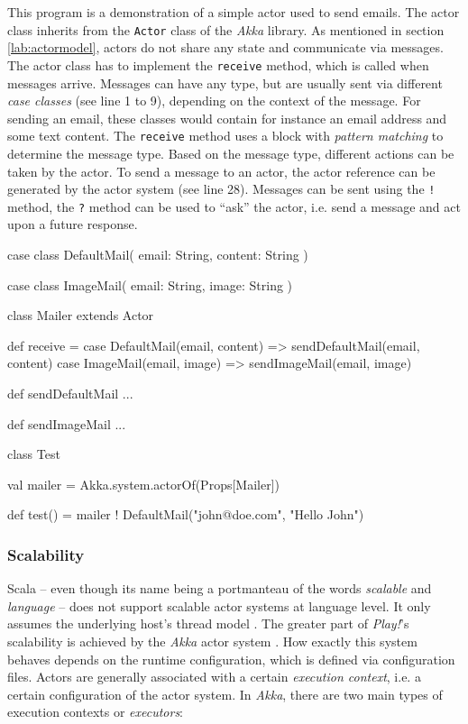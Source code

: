 \begin{program}
  \caption{This program is a demonstration of a simple actor used to send emails. The actor class inherits from the \texttt{Actor} class of the \textit{Akka} library. As mentioned in section \ref{lab:actormodel}, actors do not share any state and communicate via messages. The actor class has to implement the \texttt{receive} method, which is called when messages arrive. Messages can have any type, but are usually sent via different \textit{case classes} (see line 1 to 9), depending on the context of the message. For sending an email, these classes would contain for instance an email address and some text content. The \texttt{receive} method uses a block with \textit{pattern matching} to determine the message type. Based on the message type, different actions can be taken by the actor. To send a message to an actor, the actor reference can be generated by the actor system (see line 28). Messages can be sent using the \texttt{!} method, the \texttt{?} method can be used to ``ask'' the actor, i.e. send a message and act upon a future response.}
  \label{prog:scala-actors}
  \begin{JavaCode}
case class DefaultMail(
    email: String,
    content: String
)

case class ImageMail(
    email: String,
    image: String
)

class Mailer extends Actor {
    
    def receive = {
        case DefaultMail(email, content) =>
            sendDefaultMail(email, content)
        case ImageMail(email, image) =>
            sendImageMail(email, image)
    }

    def sendDefaultMail ...

    def sendImageMail ...

}

class Test {
    
    val mailer = Akka.system.actorOf(Props[Mailer])

    def test() = {
        mailer ! DefaultMail("john@doe.com", "Hello John")
    }

}
  \end{JavaCode}
\end{program}

\subsubsection*{Scalability}
Scala -- even though its name being a portmanteau of the words \textit{scalable} and \textit{language} -- does not support scalable actor systems at language level. It only assumes the underlying host's thread model \cite[p. 3]{Haller2009}. The greater part of \textit{Play!}'s scalability is achieved by the \textit{Akka} actor system \cite[p. 16]{Gupta2012}. How exactly this system behaves depends on the runtime configuration, which is defined via configuration files. Actors are generally associated with a certain \textit{execution context}, i.e. a certain configuration of the actor system. In \textit{Akka}, there are two main types of execution contexts or \textit{executors}:
\newpage

